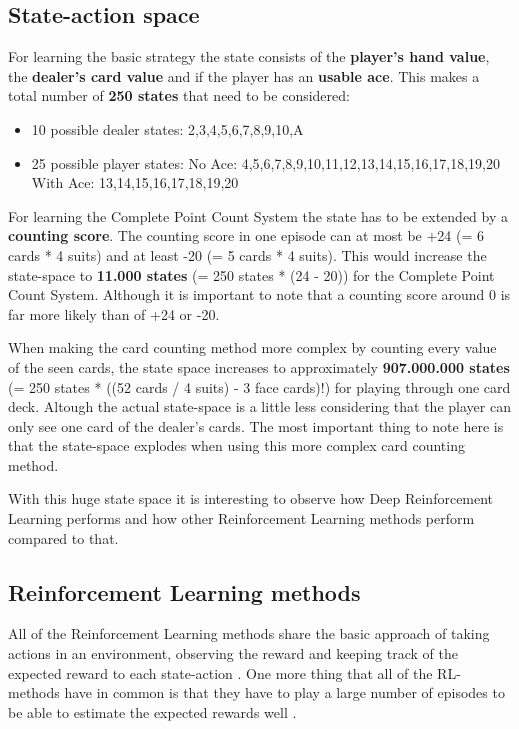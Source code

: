 \documentclass[conference]{IEEEtran}
\begin{document}
\subsection{State-action space}
For learning the basic strategy the state consists of the \textbf{player's hand value}, the \textbf{dealer's card value} and if the player has an \textbf{usable ace}. 
This makes a total number of \textbf{250 states} that need to be considered:
\begin{itemize}
	\item 10 possible dealer states: 2,3,4,5,6,7,8,9,10,A
	\item 25 possible player states:
		\subitem No Ace: 4,5,6,7,8,9,10,11,12,13,14,15,16,17,18,19,20
		\subitem With Ace: 13,14,15,16,17,18,19,20
\end{itemize}

For learning the Complete Point Count System the state has to be extended by a \textbf{counting score}.
The counting score in one episode can at most be +24 (= 6 cards * 4 suits) and at least -20 (= 5 cards * 4 suits).
This would increase the state-space to \textbf{11.000 states} (= 250 states * (24 - 20)) for the Complete Point Count System. 
Although it is important to note that a counting score around 0 is far more likely than of +24 or -20.

When making the card counting method more complex by counting every value of the seen cards, the state space increases to approximately \textbf{907.000.000 states} (= 250 states * ((52 cards / 4 suits) - 3 face cards)!) for playing through one card deck.  
Altough the actual state-space is a little less considering that the player can only see one card of the dealer's cards.
The most important thing to note here is that the state-space explodes when using this more complex card counting method. 

With this huge state space it is interesting to observe how Deep Reinforcement Learning performs and how other Reinforcement Learning methods perform compared to that. 


\subsection{Reinforcement Learning methods}
All of the Reinforcement Learning methods share the basic approach of taking actions in an environment, observing the reward and keeping track of the expected reward to each state-action \cite{b4}.
One more thing that all of the RL-methods have in common is that they have to play a large number of episodes to be able to estimate the expected rewards well \cite{b4}.
\end{document}
